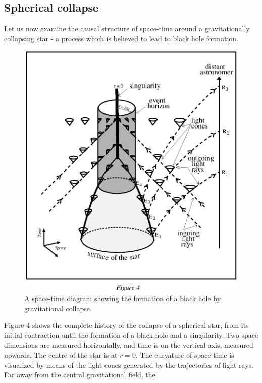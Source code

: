 \documentclass{lamuphys}
\begin{document}
\subsection {Spherical collapse}

Let us now
examine the causal structure of space-time around a gravitationally collapsing
star - a process which is believed to lead to black hole formation. 
\begin{figure}[tb]
  \begin{center}
    \leavevmode
    \includegraphics{schw.ps}
    \caption{A space-time diagram showing the formation of a black hole by
      gravitational collapse.}
  \end{center}
\end{figure}
Figure 4 shows the complete history of the collapse of a spherical 
star, from
its initial contraction until the formation of a black hole and a singularity.
Two
space dimensions are measured horizontally, and time is on the vertical axis,
measured upwards. The centre of the star is at $r=0$.  The curvature of
space-time is visualized by means of the light cones generated by the
trajectories of light rays. Far away from the central gravitational field, the
\end{document}
